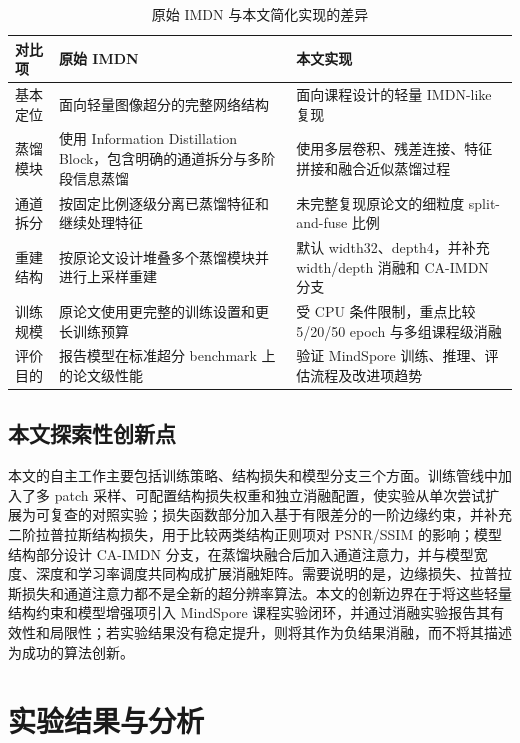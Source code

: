 \documentclass[bwprint]{report}
\begin{document}
\begin{table}[H]
    \centering
    \caption{原始 IMDN 与本文简化实现的差异}
    \label{tab:imdn-difference}
    \small
    \begin{tabular}{>{\raggedright\arraybackslash}p{2.7cm}>{\raggedright\arraybackslash}p{4.1cm}>{\raggedright\arraybackslash}p{4.1cm}}
        \toprule
        对比项 & 原始 IMDN & 本文实现 \\
        \midrule
        基本定位 & 面向轻量图像超分的完整网络结构 & 面向课程设计的轻量 IMDN-like 复现 \\
        蒸馏模块 & 使用 Information Distillation Block，包含明确的通道拆分与多阶段信息蒸馏 & 使用多层卷积、残差连接、特征拼接和融合近似蒸馏过程 \\
        通道拆分 & 按固定比例逐级分离已蒸馏特征和继续处理特征 & 未完整复现原论文的细粒度 split-and-fuse 比例 \\
        重建结构 & 按原论文设计堆叠多个蒸馏模块并进行上采样重建 & 默认 width32、depth4，并补充 width/depth 消融和 CA-IMDN 分支 \\
        训练规模 & 原论文使用更完整的训练设置和更长训练预算 & 受 CPU 条件限制，重点比较 5/20/50 epoch 与多组课程级消融 \\
        评价目的 & 报告模型在标准超分 benchmark 上的论文级性能 & 验证 MindSpore 训练、推理、评估流程及改进项趋势 \\
        \bottomrule
    \end{tabular}
\end{table}

\subsection{本文探索性创新点}
本文的自主工作主要包括训练策略、结构损失和模型分支三个方面。训练管线中加入了多 patch 采样、可配置结构损失权重和独立消融配置，使实验从单次尝试扩展为可复查的对照实验；损失函数部分加入基于有限差分的一阶边缘约束，并补充二阶拉普拉斯结构损失，用于比较两类结构正则项对 PSNR/SSIM 的影响；模型结构部分设计 CA-IMDN 分支，在蒸馏块融合后加入通道注意力，并与模型宽度、深度和学习率调度共同构成扩展消融矩阵。需要说明的是，边缘损失、拉普拉斯损失和通道注意力都不是全新的超分辨率算法。本文的创新边界在于将这些轻量结构约束和模型增强项引入 MindSpore 课程实验闭环，并通过消融实验报告其有效性和局限性；若实验结果没有稳定提升，则将其作为负结果消融，而不将其描述为成功的算法创新。

\section{实验结果与分析}
\end{document}
